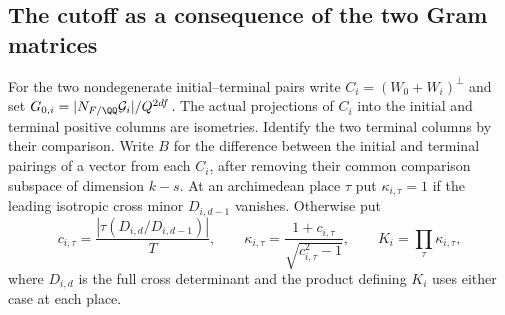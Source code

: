 \documentclass[a4paper,11pt]{article}
\theoremstyle{definition}
\theoremstyle{remark}
\numberwithin{equation}{section}
\begin{document}
\subsection{The cutoff as a consequence of the two Gram matrices}\label{nav:IX-27}
For the two nondegenerate initial--terminal pairs write
\(C_i=(W_0+W_i)^\perp\) and set
\(G_{0,i}=|N_{F/\QQ}\mathcal G_i|/Q^{2df}\). The actual
projections of \(C_i\) into the initial and terminal positive
columns are isometries. Identify the two terminal columns
by their comparison. Write \(B\) for the difference between
the initial and terminal pairings of a vector from each
\(C_i\), after removing their common comparison subspace
of dimension \(k-s\). At an archimedean place \(\tau\) put
\(\kappa_{i,\tau}=1\) if the leading isotropic cross minor
\(D_{i,d-1}\) vanishes. Otherwise put
\[
 c_{i,\tau}=\frac{|\tau(D_{i,d}/D_{i,d-1})|}{T},\qquad
 \kappa_{i,\tau}=\frac{1+c_{i,\tau}}{\sqrt{c_{i,\tau}^2-1}},
                   \qquad K_i=\prod_\tau\kappa_{i,\tau},
\]
where \(D_{i,d}\) is the full cross determinant and the
product defining \(K_i\) uses either case at each place.
\end{document}
